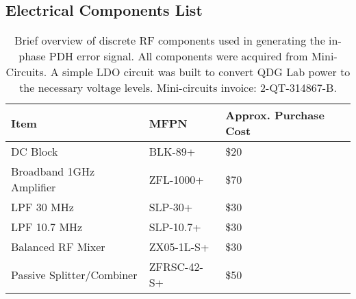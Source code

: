 \subsection{Electrical Components List}
\label{app:components}

\begin{table}[!hrt]
  \begin{tabularx}{\linewidth}{|L|L|L|}
  \hline
  \textbf{Item} & \textbf{MFPN} & \textbf{Approx. Purchase Cost} \\
  \hline
  DC Block & BLK-89+ & \$20 \\
  Broadband 1GHz Amplifier & ZFL-1000+ & \$70 \\
  LPF 30 MHz & SLP-30+ & \$30 \\
  LPF 10.7 MHz & SLP-10.7+ & \$30 \\
  Balanced RF Mixer & ZX05-1L-S+ & \$30 \\
  Passive Splitter/Combiner & ZFRSC-42-S+ & \$50 \\
  \hline
  \end{tabularx}
  \caption{Brief overview of discrete RF components used in generating the in-phase PDH error signal. All components were acquired from Mini-Circuits. A simple LDO circuit was built to convert QDG Lab power to the necessary voltage levels. Mini-circuits invoice: 2-QT-314867-B.}
  \label{budget_table}
\end{table}